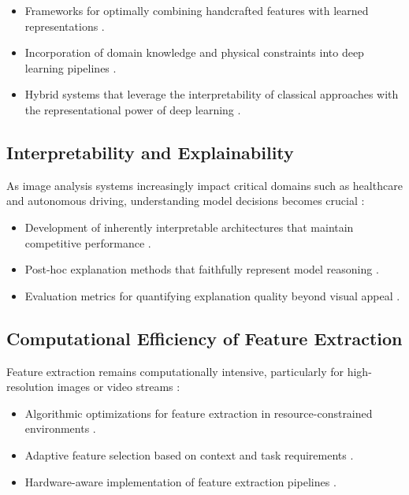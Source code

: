 \begin{itemize}
    \item Frameworks for optimally combining handcrafted features with learned representations \cite{wang2017combining}.
    
    \item Incorporation of domain knowledge and physical constraints into deep learning pipelines \cite{karpatne2017theory}.
    
    \item Hybrid systems that leverage the interpretability of classical approaches with the representational power of deep learning \cite{huang2017speed}.
\end{itemize}

\subsection{Interpretability and Explainability}
As image analysis systems increasingly impact critical domains such as healthcare and autonomous driving, understanding model decisions becomes crucial \cite{samek2017explainable}:

\begin{itemize}
    \item Development of inherently interpretable architectures that maintain competitive performance \cite{rudin2019stop}.
    
    \item Post-hoc explanation methods that faithfully represent model reasoning \cite{ribeiro2016should}.
    
    \item Evaluation metrics for quantifying explanation quality beyond visual appeal \cite{adebayo2018sanity}.
\end{itemize}

\subsection{Computational Efficiency of Feature Extraction}
Feature extraction remains computationally intensive, particularly for high-resolution images or video streams \cite{tang2014feature}:

\begin{itemize}
    \item Algorithmic optimizations for feature extraction in resource-constrained environments \cite{rublee2011orb}.
    
    \item Adaptive feature selection based on context and task requirements \cite{han2016deep}.
    
    \item Hardware-aware implementation of feature extraction pipelines \cite{suleiman2017towards}.
\end{itemize}

